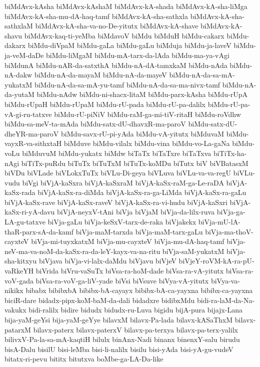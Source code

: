 {biMdAvx-kAsha
biMdAvx-kAshaM
biMdAvx-kA-shada
biMdAvx-kA-sha-liMga
biMdAvx-kA-sha-mu-dA-haq-tamf
biMdAvx-kA-sha-sathxla
biMdAvx-kA-sha-sathxlaM
biMdAvx-kA-sha-va-no-De-yitutx
biMdAvx-kA-shave
biMdAvx-kA-shavu
biMdAvx-kaq-ti-yeMba
biMdavoV
biMdu
biMduH
biMdu-cakarx
biMdu-dakarx
biMdu-diVpaM
biMdu-gaLa
biMdu-gaLu
biMduja
biMdu-ja-laveV
biMdu-ja-veM-daDe
biMdu-liMgaM
biMdu-mA-tarx-da-lAda
biMdu-ma-ya-vAgi
biMdunA
biMdu-nAR-da-satxthA
biMdu-nA-dA-tamxkaM
biMdu-nAda
biMdu-nA-dakw
biMdu-nA-da-mayaM
biMdu-nA-da-mayeV
biMdu-nA-da-sa-mA-yukatxM
biMdu-nA-da-sa-mA-yu-tamf
biMdu-nA-da-sa-ma-nivx-tamf
biMdu-nA-da-yutaM
biMdu-nAdw
biMdu-ni-shacx-litaM
biMdu-parx-kAsha
biMdu-rUpA
biMdu-rUpaH
biMdu-rUpaM
biMdu-rU-pada
biMdu-rU-pa-dalilx
biMdu-rU-pa-vA-gi-ru-tatxve
biMdu-rU-piNiV
biMdu-raM-ga-mi-tiV-ritaH
biMdu-roVdhw
biMdu-sa-meV-ta-mAda
biMdu-satx-dU-dhavxR-ma-paroV
biMdu-satx-dU-dheYR-ma-paroV
biMdu-savx-rU-pi-yAda
biMdu-vA-yitutx
biMduvaM
biMdu-vayxR-va-sithxtaH
biMduve
biMdu-vilalx
biMdu-vina
biMdu-vo-La-gaNa
biMdu-voLu
biMduvuM
biMdu-yukatx
biMdw
biTaTx
biTaTxre
biTaTxva
biTiTx-ha-nAgi
biTiTx-puRdu
biTuTx
biTuTxM
biTuTx-koMDu
biTutx
biV
biVBatasxM
biVDu
biVLade
biVLokxTuTx
biVLu-Di-geya
biVLuva
biVLu-va-va-regU
biVLu-vudu
biVgi
biVjA-kaSxra
biVjA-kaSxraM
biVjA-kaSx-raM-ga-Le-raDA
biVjA-kaSx-rada
biVjA-kaSx-ra-diMda
biVjA-kaSx-ra-ga-LiMda
biVjA-kaSx-ra-gaLu
biVjA-kaSx-rave
biVjA-kaSx-raveV
biVjA-kaSx-ra-vi-hudu
biVjA-kaSxri
biVjA-kaSx-ri-yA-davu
biVjA-neyxV-tAni
biVja
biVjaM
biVja-da-lilx-ruva
biVja-ga-LA-gu-tatxve
biVja-gaLu
biVja-keSxV-tarx-de-raka
biVjakekx
biVja-mU-lA-thaR-parx-sA-da-kamf
biVja-maM-tarxda
biVja-maM-tarx-gaLu
biVja-ma-thoV-cayxteV
biVja-mi-tuyxkatxM
biVja-mu-cayxteV
biVja-mu-dA-haq-tamf
biVja-neV-ma-va-noM-da-kaSx-ra-da-leY-kayx-va-na-ritu
biVja-saM-yukatxM
biVja-sha-kitxyu
biVjava
biVja-vi-lalx-daMdu
biVjavu
biVjeV
biVjeY-roVM-kA-ra-pU-vaRkeYH
biVrida
biVru-vaSuTx
biVsa-ra-hoM-dade
biVsa-ra-vA-yitutx
biVsa-ra-voV-gada
biVsa-ra-voV-ga-liV-yade
biVsi
biVsuve
biVya-vA-yitutx
biVya-va-nikikx
bibabx
bibibxbA
bibibx-bA-cayayx
bibibx-bA-ca-yayxna
bibibx-ca-yayxna
biciR-dare
bidadx-pipx-koM-baM-da-dali
bidadxre
bidibxMdu
bidi-ra-laM-da-Na-vakukx
bidi-ralilx
bidire
bidudx
bidudx-ru-Luva
bigidu
bijA-pura
bijajx-Lana
bija-yaM-geYsi
bija-yaM-geYye
bilavxM
bilavx-Pa-lada
bilavx-kASaThxM
bilavx-patarxM
bilavx-paterx
bilavx-paterxV
bilavx-pa-terxya
bilavx-pa-terx-yalilx
bilivxV-Pa-la-sa-mA-kaqtiH
bilulx
binAnx-Nadi
binanx
binenxY-salu
birudu
bisA-Dalu
bisilU
bisi-leMba
bisi-li-nalilx
bisilu
bisi-yAda
bisi-yA-gu-vudeV
bitatx-ri-pevu
bititx
bitutxva
boMbe-ga-LA-Da-like
}
